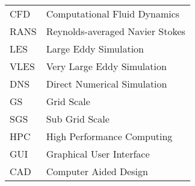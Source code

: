 \begin{table}[h]
\begin{tabular}{ll}
CFD&Computational Fluid Dynamics\\
RANS&Reynolds-averaged Navier Stokes\\
LES&Large Eddy Simulation\\
VLES&Very Large Eddy Simulation\\
DNS&Direct Numerical Simulation\\
GS&Grid Scale\\
SGS&Sub Grid Scale\\
HPC&High Performance Computing\\
GUI&Graphical User Interface\\
CAD&Computer Aided Design\\
\end{tabular}
\end{table}